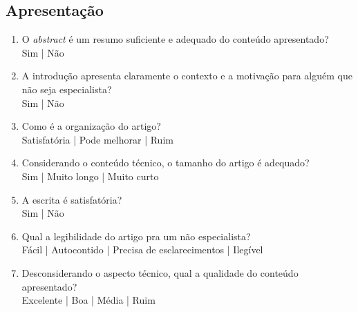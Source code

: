 \documentclass{UnBExam}%
\begin{document}
    \subsection{Apresentação}%
    \begin{enumerate}
        \item O \emph{abstract} é um resumo suficiente e adequado do conteúdo
        apresentado?\\%
        Sim | Não

        \item A introdução apresenta claramente o contexto e a motivação para
        alguém que não seja especialista?\\%
        Sim | Não

        \item Como é a organização do artigo?\\%
        Satisfatória | Pode melhorar | Ruim

        \item Considerando o conteúdo técnico, o tamanho do artigo é adequado?\\%
        Sim | Muito longo | Muito curto

        \item A escrita é satisfatória?\\%
        Sim | Não

        \item Qual a legibilidade do artigo pra um não especialista?\\%
        Fácil | Autocontido | Precisa de esclarecimentos | Ilegível

        \item Desconsiderando o aspecto técnico, qual a qualidade do conteúdo
        apresentado?\\%
        Excelente | Boa | Média | Ruim
    \end{enumerate}%
\end{document}
